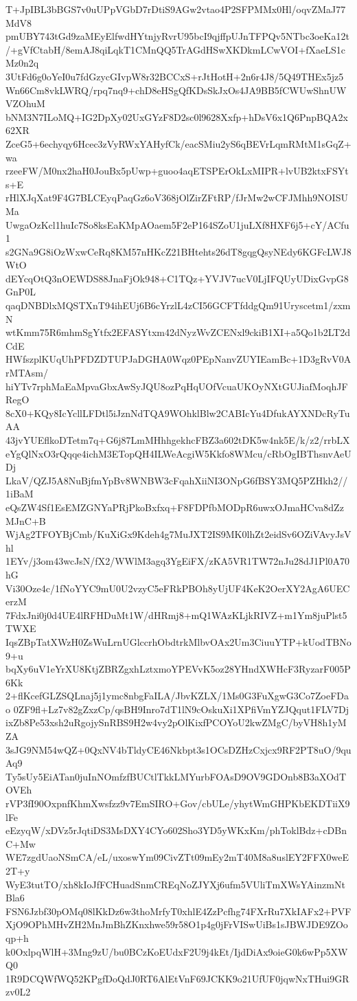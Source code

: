T+JpIBL3bBGS7v0uUPpVGbD7rDtiS9AGw2vtao4P2SFPMMx0Hl/oqvZMaJ77MdV8
pmUBY743tGd9zaMEyElfwdHYtnjyRvrU95bcI9qjffpUJnTFPQv5NTbc3oeKa12t
/+gVfCtabH/8emAJ8qiLqkT1CMnQQ5TrAGdHSwXKDkmLCwVOI+fXaeLS1cMz0n2q
3UtFd6g0oYeI0u7fdGzycGIvpW8r32BCCxS+rJtHotH+2n6r4J8/5Q49THEx5jz5
Wn66Cm8vkLWRQ/rpq7nq9+chD8eHSgQfKDsSkJxOs4JA9BB5fCWUwShnUWVZOhuM
bNM3N7ILoMQ+IG2DpXy02UxGYzF8D2sc0l9628Xxfp+hDsV6x1Q6PnpBQA2x62XR
ZceG5+6echyqy6Hcec3zVyRWxYAHyfCk/eacSMiu2yS6qBEVrLqmRMtM1sGqZ+wa
rzeeFW/M0nx2haH0JouBx5pUwp+guoo4aqETSPErOkLxMIPR+lvUB2ktxFSYts+E
rHlXJqXat9F4G7BLCEyqPaqGz6oV368jOlZirZFtRP/fJrMw2wCFJMhh9NOISUMa
UwgaOzKcl1huIc7So8ksEaKMpAOaem5F2eP164SZoU1juLXf8HXF6j5+cY/ACfu1
s2GNa9G8iOzWxwCeRq8KM57nHKcZ21BHtehts26dT8gqgQsyNEdy6KGFcLWJ8WtO
dEYcqOtQ3nOEWDS88JnaFjOk948+C1TQz+YVJV7ucV0LjIFQUyUDixGvpG8GnP0L
qaqDNBDlxMQSTXnT94ihEUj6B6cYrzlL4zCI56GCFTfddgQm91Uryscetm1/zxmN
wtKmm75R6mhmSgYtfx2EFASYtxm42dNyzWvZCENxl9ckiB1XI+a5Qo1b2LT2dCdE
HWfszplKUqUhPFDZDTUPJaDGHA0Wqz0PEpNanvZUYIEamBc+1D3gRvV0ArMTAsm/
hiYTv7rphMaEaMpvaGbxAwSyJQU8ozPqHqUOfVcuaUKOyNXtGUJiafMoqhJFRegO
8cX0+KQy8IcYcllLFDtl5iJznNdTQA9WOhklBlw2CABIcYu4DfukAYXNDcRyTuAA
43jvYUEflkoDTetm7q+G6j87LmMHhhgekhcFBZ3a602tDK5w4nk5E/k/z2/rrbLX
eYgQlNxO3rQqqe4ichM3ETopQH4ILWeAcgiW5Kkfo8WMcu/cRbOgIBThsnvAeUDj
LkaV/QZJ5A8NuBjfmYpBv8WNBW3cFqahXiiNI3ONpG6fBSY3MQ5PZHkh2//1iBaM
eQsZW4Sf1EsEMZGNYaPRjPkoBxfxq+F8FDPfbMODpR6uwxOJmaHCva8dZzMJnC+B
WjAg2TFOYBjCmb/KuXiGx9Kdeh4g7MuJXT2IS9MK0lhZt2eidSv6OZiVAvyJsVhl
1EYv/j3om43wcJsN/fX2/WWlM3agq3YgEiFX/zKA5VR1TW72nJu28dJ1Pl0A70hG
Vi30Oze4c/1fNoYYC9mU0U2vzyC5eFRkPBOh8yUjUF4KeK2OerXY2AgA6UECerzM
7FdxJni0j0d4UE4lRFHDuMt1W/dHRmj8+mQ1WAzKLjkRIVZ+m1Ym8juPlst5TWXE
IqsZBpTatXWzH0ZsWuLrnUGlccrhObdtrkMlbvOAx2Um3CiuuYTP+kUodTBNo9+u
bqXy6uV1eYrXU8KtjZBRZgxhLztxmoYPEVvK5oz28YHndXWHcF3RyzarF005P6Kk
2+flKcefGLZSQLnaj5j1ymc8nbgFaILA/JbvKZLX/1Ms0G3FuXgwG3Co7ZoeFDao
0ZF9fl+Lz7v82gZxzCp/qsBH9Inro7dT1lN9cOskuXi1XPfiVmYZJQqut1FLV7Dj
ixZb8Pe53xsh2uRgojySnRBS9H2w4vy2pOlKixfPCOYoU2kwZMgC/byVH8h1yMZA
3sJG9NM54wQZ+0QxNV4bTldyCE46Nkbpt3s1OCsDZHzCxjcx9RF2PT8uO/9quAq9
Ty5sUy5EiATan0juInNOmfzfBUCtlTkkLMYurbFOAsD9OV9GDOnb8B3aXOdTOVEh
rVP3fI90OxpnfKhmXwsfzz9v7EmSIRO+Gov/cbULe/yhytWmGHPKbEKDTiiX9lFe
eEzyqW/xDVz5rJqtiDS3MsDXY4CYo602Sho3YD5yWKxKm/phToklBdz+cDBnC+Mw
WE7zgdUaoNSmCA/eL/uxoswYm09CivZTt09mEy2mT40M8a8uslEY2FFX0weE2T+y
WyE3tutTO/xh8kIoJfFCHuadSnmCREqNoZJYXj6ufm5VUliTmXWsYAinzmNtBla6
FSN6Jzbf30pOMq08lKkDz6w3thoMrfyT0xhlE4ZzPcfhg74FXrRu7XkIAFx2+PVF
XjO9OPhMHvZH2MnJmBhZKnxhwe59r58O1p4g0jFrVISwUiBs1sJBWJDE9ZOoqp+h
k0OxlpqWlH+3Mng9zU/bu0BCzKoEUdxF2U9j4kEt/IjdDiAx9oieG0k6wPp5XWQ0
1R9DCQWfWQ52KPgfDoQdJ0RT6AlEtVnF69JCKK9o21UfUF0jqwNxTHui9GRzv0L2

